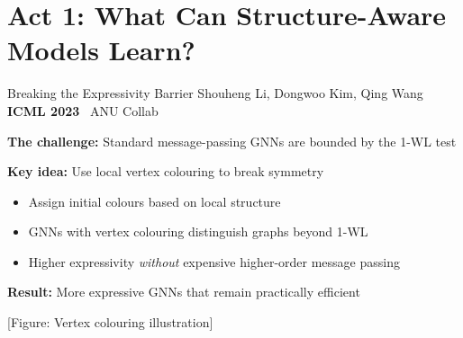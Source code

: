 \documentclass[aspectratio=169,11pt]{beamer}
\newcommand{\papercite}[1]{{\scriptsize\color{mutedText}#1}}
\newcommand{\venue}[1]{{\small\textcolor{postechBlue}{\textbf{#1}}}}
\newcommand{\anucollab}{\faHandshake~\textcolor{anuGold}{\scriptsize ANU Collab}}
\begin{document}
\section{Act 1: What Can Structure-Aware Models Learn?}

\begin{frame}{Breaking the Expressivity Barrier}
  \papercite{Shouheng Li, Dongwoo Kim, Qing Wang \hfill \venue{ICML 2023} \anucollab}
  \vspace{8pt}

  \textbf{The challenge:} Standard message-passing GNNs are bounded by the \alert{1-WL test}
  \vspace{6pt}

  \textbf{Key idea:} Use \alert{local vertex colouring} to break symmetry
  \begin{itemize}
    \item Assign initial colours based on local structure
    \item GNNs with vertex colouring distinguish graphs beyond 1-WL
    \item Higher expressivity \textit{without} expensive higher-order message passing
  \end{itemize}
  \vspace{8pt}

  \textbf{Result:} More expressive GNNs that remain practically efficient

  \begin{center}
    {\small\color{mutedText}[Figure: Vertex colouring illustration]}
  \end{center}
\end{frame}
\end{document}
